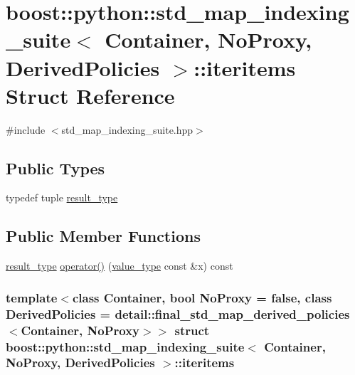 \hypertarget{structboost_1_1python_1_1std__map__indexing__suite_1_1iteritems}{\section{boost\-:\-:python\-:\-:std\-\_\-map\-\_\-indexing\-\_\-suite$<$ \-Container, \-No\-Proxy, \-Derived\-Policies $>$\-:\-:iteritems \-Struct \-Reference}
\label{structboost_1_1python_1_1std__map__indexing__suite_1_1iteritems}
}


{\ttfamily \#include $<$std\-\_\-map\-\_\-indexing\-\_\-suite.\-hpp$>$}

\subsection*{\-Public \-Types}
\begin{DoxyCompactItemize}
\item 
typedef tuple \hyperlink{structboost_1_1python_1_1std__map__indexing__suite_1_1iteritems_a97f1c788acd4c665fba8ae1fcc946a45}{result\-\_\-type}
\end{DoxyCompactItemize}
\subsection*{\-Public \-Member \-Functions}
\begin{DoxyCompactItemize}
\item 
\hyperlink{structboost_1_1python_1_1std__map__indexing__suite_1_1iteritems_a97f1c788acd4c665fba8ae1fcc946a45}{result\-\_\-type} \hyperlink{structboost_1_1python_1_1std__map__indexing__suite_1_1iteritems_a4adb01be48bc47d6c1636957267fdca2}{operator()} (\hyperlink{classboost_1_1python_1_1std__map__indexing__suite_aff9ed68cf30e805a04a313d92c62ab38}{value\-\_\-type} const \&x) const 
\end{DoxyCompactItemize}
\subsubsection*{template$<$class \-Container, bool \-No\-Proxy = false, class \-Derived\-Policies = detail\-::final\-\_\-std\-\_\-map\-\_\-derived\-\_\-policies$<$\-Container, No\-Proxy$>$$>$ struct boost\-::python\-::std\-\_\-map\-\_\-indexing\-\_\-suite$<$ Container, No\-Proxy, Derived\-Policies $>$\-::iteritems}



